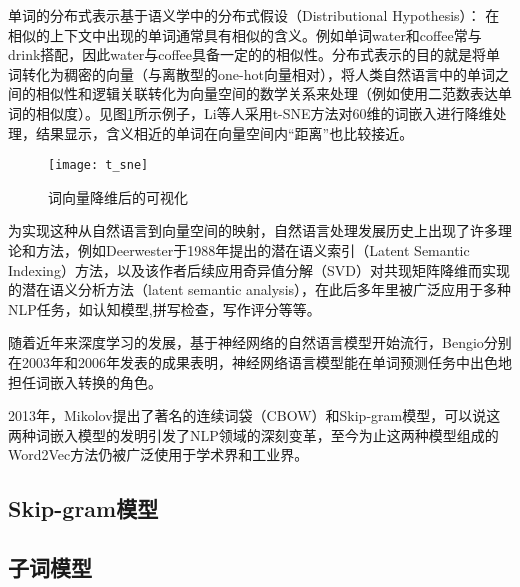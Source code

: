 单词的分布式表示基于语义学中的分布式假设（Distributional Hypothesis）\cite{distributional_hypothesis}：
在相似的上下文中出现的单词通常具有相似的含义。例如单词water和coffee常与drink搭配，因此water与coffee具备一定的的相似性。分布式表示的目的就是将单词转化为稠密的向量（与离散型的one-hot向量相对），将人类自然语言中的单词之间的相似性和逻辑关联转化为向量空间的数学关系来处理（例如使用二范数表达单词的相似度）。见图\ref{fig:t_sne}所示例子，Li等人\cite{visualizing}采用t-SNE方法对60维的词嵌入进行降维处理，结果显示，含义相近的单词在向量空间内“距离”也比较接近。
\begin{figure}[htp]
\centering
\texttt{[image: t\_sne]}
\caption{词向量降维后的可视化}
\label{fig:t_sne}
\end{figure}


为实现这种从自然语言到向量空间的映射，自然语言处理发展历史上出现了许多理论和方法，例如Deerwester于1988年提出的潜在语义索引（Latent Semantic Indexing）方法\cite{LSI}，以及该作者后续应用奇异值分解（SVD）对共现矩阵降维而实现的潜在语义分析方法（latent semantic analysis）\cite{LSA}，在此后多年里被广泛应用于多种NLP任务，如认知模型\cite{cognitive_model},拼写检查\cite{spell_checking}，写作评分\cite{essay_grading}等等。

随着近年来深度学习的发展，基于神经网络的自然语言模型开始流行，Bengio分别在2003年\cite{bengio2003}和2006年\cite{bengio2006}发表的成果表明，神经网络语言模型能在单词预测任务中出色地担任词嵌入转换的角色。

2013年，Mikolov提出了著名的连续词袋（CBOW）和Skip-gram模型\cite{skipgram}，可以说这两种词嵌入模型的发明引发了NLP领域的深刻变革，至今为止这两种模型组成的Word2Vec方法仍被广泛使用于学术界和工业界。

%
%



\subsection{Skip-gram模型}
\subsection{子词模型}


